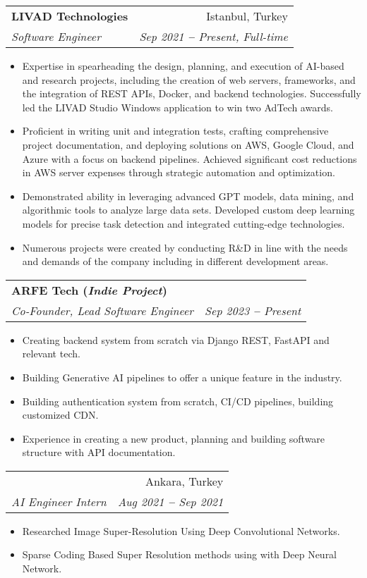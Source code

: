 \documentclass[letterpaper,11pt]{article}
\makeatletter
\newcommand{\resumeItem}[1]{
  \item\small{
    {#1 \vspace{-2pt}}
  }
}
\newcommand{\resumeSubheading}[4]{
  \vspace{-2pt}\item
    \begin{tabular*}{0.97\textwidth}[t]{l@{\extracolsep{\fill}}r}
      \textbf{#1} & #2 \\
      \textit{\small#3} & \textit{\small #4} \\
    \end{tabular*}\vspace{-7pt}
}
\newcommand{\resumeItemListStart}{\begin{itemize}}
\newcommand{\resumeItemListEnd}{\end{itemize}\vspace{-5pt}}
\makeatother
\begin{document}
{{    \resumeSubheading
      {LIVAD Technologies}{Istanbul, Turkey}
      {Software Engineer}{Sep 2021 \textbf{--} Present, Full-time}
        \resumeItemListStart
            \resumeItem{Expertise in spearheading the design, planning, and execution of AI-based and research projects, including the creation of web servers, frameworks, and the integration of REST APIs, Docker, and backend technologies. Successfully led the LIVAD Studio Windows application to win two AdTech awards.}
            \resumeItem{Proficient in writing unit and integration tests, crafting comprehensive project documentation, and deploying solutions on AWS, Google Cloud, and Azure with a focus on backend pipelines. Achieved significant cost reductions in AWS server expenses through strategic automation and optimization.}
            \resumeItem{Demonstrated ability in leveraging advanced GPT models, data mining, and algorithmic tools to analyze large data sets. Developed custom deep learning models for precise task detection and integrated cutting-edge technologies.}
           \resumeItem{Numerous projects were created by conducting  R\&D in line with the needs and demands of the company including in different development areas.}

        \resumeItemListEnd
\vspace{5pt}
  
    \resumeSubheading
      {ARFE Tech (\textit{Indie Project})}{}
      {Co-Founder, Lead Software Engineer}{Sep 2023 \textbf{--} Present}
        \resumeItemListStart
            \resumeItem{Creating backend system from scratch via Django REST, FastAPI and relevant tech.}
            \resumeItem{Building Generative AI pipelines to offer a unique feature in the industry.}
            \resumeItem{Building authentication system from scratch, CI/CD pipelines, building customized CDN.}
            \resumeItem{Experience in creating a new product, planning and building software structure with  API documentation.}
        \resumeItemListEnd

  \vspace{5pt}
        \resumeSubheading
           {\parbox{0.7\linewidth}{The Scientific and Technological Research Council of Turkey (TUBITAK) Space Technologies}}{Ankara, Turkey}
      {AI Engineer Intern}{Aug 2021 \textbf{--} Sep 2021}
        \resumeItemListStart
            \resumeItem{Researched Image Super-Resolution Using Deep Convolutional Networks.}
            \resumeItem{Sparse Coding Based Super Resolution methods using with Deep Neural Network.}
        \resumeItemListEnd

}}
\end{document}
